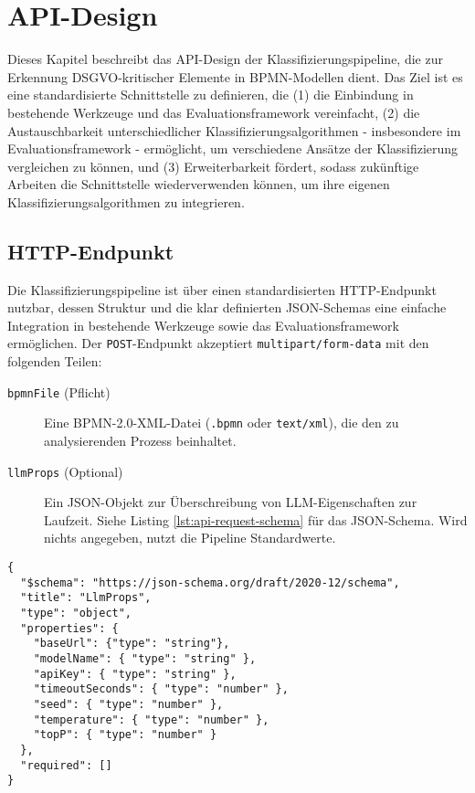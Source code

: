 \section{API-Design}\label{sec:api-design}

Dieses Kapitel beschreibt das API-Design der Klassifizierungspipeline, die zur Erkennung \ac{DSGVO}-kritischer Elemente in \ac{BPMN}-Modellen dient. Das Ziel ist es eine standardisierte Schnittstelle zu definieren, die (1) die Einbindung in bestehende Werkzeuge und das Evaluationsframework vereinfacht, (2) die Austauschbarkeit unterschiedlicher Klassifizierungsalgorithmen - insbesondere im Evaluationsframework - ermöglicht, um verschiedene Ansätze der Klassifizierung vergleichen zu können, und (3) Erweiterbarkeit fördert, sodass zukünftige Arbeiten die Schnittstelle wiederverwenden können, um ihre eigenen Klassifizierungsalgorithmen zu integrieren.

\subsection*{HTTP-Endpunkt}

Die Klassifizierungspipeline ist über einen standardisierten HTTP-Endpunkt nutzbar, dessen Struktur und die klar definierten JSON-Schemas eine einfache Integration in bestehende Werkzeuge sowie das Evaluationsframework ermöglichen. Der \texttt{POST}-Endpunkt akzeptiert \texttt{multipart/form-data} mit den folgenden Teilen:

\begin{description}
    \item[\texttt{bpmnFile} (Pflicht)] Eine BPMN-2.0-XML-Datei (\texttt{.bpmn} oder \texttt{text/xml}), die den zu analysierenden Prozess beinhaltet.
    \item[\texttt{llmProps} (Optional)] Ein JSON-Objekt zur Überschreibung von \ac{LLM}-Eigenschaften zur Laufzeit. Siehe Listing \ref{lst:api-request-schema} für das JSON-Schema. Wird nichts angegeben, nutzt die Pipeline Standardwerte.
\end{description}

\begin{lstlisting}[caption={JSON-Schema der \texttt{llmProps}.},label={lst:api-request-schema}]
{
  "$schema": "https://json-schema.org/draft/2020-12/schema",
  "title": "LlmProps",
  "type": "object",
  "properties": {
    "baseUrl": {"type": "string"},
    "modelName": { "type": "string" },
    "apiKey": { "type": "string" },
    "timeoutSeconds": { "type": "number" },
    "seed": { "type": "number" },
    "temperature": { "type": "number" },
    "topP": { "type": "number" }
  },
  "required": []
}
\end{lstlisting}

